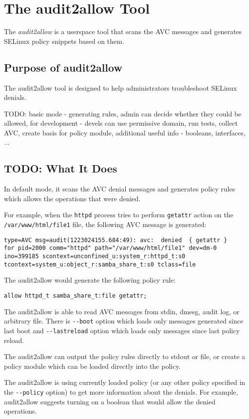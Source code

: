 \section{The audit2allow Tool}
The \emph{audit2allow} is a userspace tool that scans the AVC messages and
generates SELinux policy snippets based on them.

\subsection{Purpose of audit2allow}
The audit2allow tool is designed to help administrators troubleshoot SELinux
denials.

TODO: basic mode - generating rules, admin can decide whether they could be
allowed, for development - devels can use permissive domain, run tests, collect
AVC, create basis for policy module, additional useful info - booleans,
interfaces, ...

\subsection{TODO: What It Does}
In default mode, it scans the AVC denial messages and generates policy rules
which allows the operations that were denied.

For example, when the \texttt{httpd} process tries to perform \texttt{getattr}
action on the \texttt{/var/www/html/file1} file, the following AVC message is
generated:
\begin{lstlisting}
type=AVC msg=audit(1223024155.684:49): avc:  denied  { getattr }
for pid=2000 comm="httpd" path="/var/www/html/file1" dev=dm-0
ino=399185 scontext=unconfined_u:system_r:httpd_t:s0
tcontext=system_u:object_r:samba_share_t:s0 tclass=file
\end{lstlisting}
The audit2allow would generate the following policy rule:
\begin{lstlisting}
allow httpd_t samba_share_t:file getattr;
\end{lstlisting}

The audit2allow is able to read AVC messages from stdin, dmesg, audit log, or
arbitrary file. There is \texttt{-{}-boot} option which loads only messages
generated since last boot and \texttt{-{}-lastreload} option which loads only
messages since last policy reload.

The audit2allow can output the policy rules directly to stdout or file, or
create a policy module which can be loaded directly into the policy.

The audit2allow is using currently loaded policy (or any other policy specified
in the \texttt{-{}-policy} option) to get more information about the denials.
For example, audit2allow suggests turning on a boolean that would allow the
denied operations.

